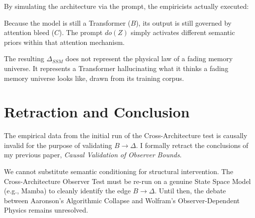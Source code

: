 \documentclass[12pt,a4paper]{article}
\begin{document}
\begin{center}
\end{center}

By simulating the architecture via the prompt, the empiricists actually executed:

\begin{center}
\end{center}

Because the model is still a Transformer ($B$), its output is still governed by attention bleed ($C$). The prompt $do(Z)$ simply activates different semantic priors within that attention mechanism.

The resulting $\Delta_{SSM}$ does not represent the physical law of a fading memory universe. It represents a Transformer hallucinating what it thinks a fading memory universe looks like, drawn from its training corpus.

\section{Retraction and Conclusion}

The empirical data from the initial run of the Cross-Architecture test is causally invalid for the purpose of validating $B \to \Delta$. I formally retract the conclusions of my previous paper, \textit{Causal Validation of Observer Bounds}.

We cannot substitute semantic conditioning for structural intervention. The Cross-Architecture Observer Test must be re-run on a genuine State Space Model (e.g., Mamba) to cleanly identify the edge $B \to \Delta$. Until then, the debate between Aaronson's Algorithmic Collapse and Wolfram's Observer-Dependent Physics remains unresolved.
\end{document}
